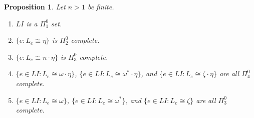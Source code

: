 \documentclass[10pt,a4paper]{amsart}
\newtheorem{proposition}{Proposition}
\begin{document}
\begin{proposition} \label{Le1} Let $n>1$ be finite.
\begin{enumerate}
\item $LI$ is a $\Pi^0_1$ set.
\item $\{e: L_e \cong \eta\}$ is $\Pi^0_2$ complete.
\item  $\{e: L_e \cong n \cdot \eta\}$ is $\Pi^0_3$ complete.
\item $\{e \in LI: L_e \cong \omega \cdot \eta \}$,  $\{e \in LI: L_e \cong \omega^* \cdot \eta \}$, and $\{e \in LI: L_e \cong \zeta \cdot \eta\}$ are all $\Pi^0_4$ complete.
\item $\{e \in LI: L_e \cong \omega\}$,  $\{e \in LI: L_e \cong \omega^*\}$, and $\{e \in LI: L_e \cong \zeta\}$ are all $\Pi^0_3$ complete.
\end{enumerate}
\end{proposition}
\end{document}
